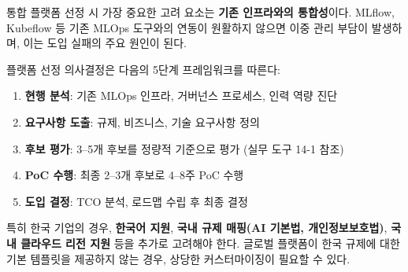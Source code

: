 통합 플랫폼 선정 시 가장 중요한 고려 요소는 \textbf{기존 인프라와의 통합성}이다. MLflow, Kubeflow 등 기존 MLOps 도구와의 연동이 원활하지 않으면 이중 관리 부담이 발생하며, 이는 도입 실패의 주요 원인이 된다\cite{kreuzberger2023machine}.

플랫폼 선정 의사결정은 다음의 5단계 프레임워크를 따른다:

\begin{enumerate}
    \item \textbf{현행 분석}: 기존 MLOps 인프라, 거버넌스 프로세스, 인력 역량 진단
    \item \textbf{요구사항 도출}: 규제, 비즈니스, 기술 요구사항 정의
    \item \textbf{후보 평가}: 3--5개 후보를 정량적 기준으로 평가 (실무 도구 14-1 참조)
    \item \textbf{PoC 수행}: 최종 2--3개 후보로 4--8주 PoC 수행
    \item \textbf{도입 결정}: TCO 분석, 로드맵 수립 후 최종 결정
\end{enumerate}

특히 한국 기업의 경우, \textbf{한국어 지원}, \textbf{국내 규제 매핑(AI 기본법, 개인정보보호법)}, \textbf{국내 클라우드 리전 지원} 등을 추가로 고려해야 한다. 글로벌 플랫폼이 한국 규제에 대한 기본 템플릿을 제공하지 않는 경우, 상당한 커스터마이징이 필요할 수 있다.


